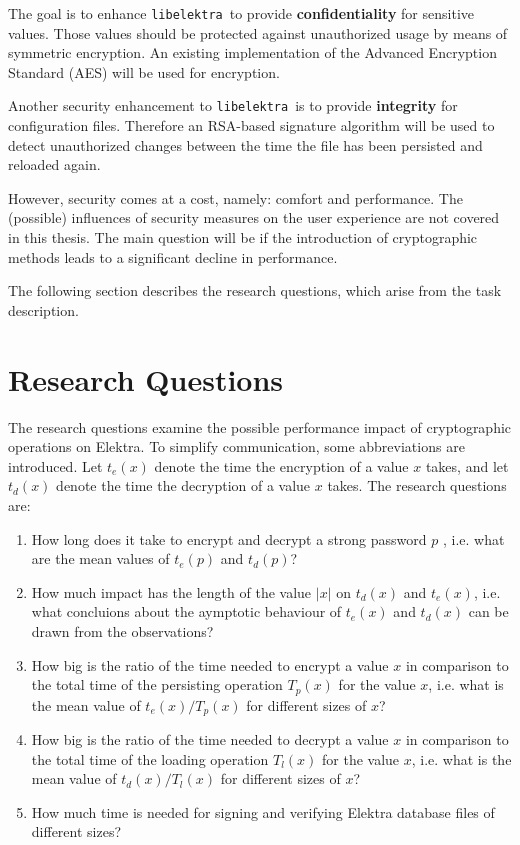 \documentclass[a4paper,12pt]{article}
\newcommand{\libelektra}{\texttt{libelektra}~}
\begin{document}
The goal is to enhance \libelektra to provide \textbf{confidentiality} for sensitive values.
Those values should be protected against unauthorized usage by means of symmetric encryption.
An existing implementation of the Advanced Encryption Standard (AES) will be used for encryption.

Another security enhancement to \libelektra is to provide \textbf{integrity} for configuration files.
Therefore an RSA-based signature algorithm will be used to detect unauthorized changes between the time the file has been persisted and reloaded again.

However, security comes at a cost, namely: comfort and performance. The (possible) influences of security measures on the user experience are not covered in this thesis. The main question will be if the introduction of cryptographic methods leads to a significant decline in performance.

The following section describes the research questions, which arise from the task description.


\section{Research Questions}

The research questions examine the possible performance impact of cryptographic operations on Elektra. 
To simplify communication, some abbreviations are introduced. 
Let $t_e(x)$ denote the time the encryption of a value $x$ takes, and let $t_d(x)$ denote the time the decryption of a value $x$ takes.
The research questions are:

\begin{enumerate}
\item How long does it take to encrypt and decrypt a strong password $p$ \cite{5461951,Holt:2011:IRS:2047456.2047461}, i.e. what are the mean values of $t_e(p)$ and $t_d(p)$?

\item How much impact has the length of the value $|x|$ on $t_d(x)$ and $t_e(x)$, i.e. what concluions about the aymptotic behaviour of $t_e(x)$ and $t_d(x)$ can be drawn from the observations?

\item How big is the ratio of the time needed to encrypt a value $x$ in comparison to the total time of the persisting operation $T_p(x)$ for the value $x$, i.e. what is the mean value of $t_e(x)/T_p(x)$ for different sizes of $x$?

\item How big is the ratio of the time needed to decrypt a value $x$ in comparison to the total time of the loading operation $T_l(x)$ for the value $x$, i.e. what is the mean value of $t_d(x)/T_l(x)$ for different sizes of $x$?

\item How much time is needed for signing and verifying Elektra database files of different sizes?

\end{enumerate}
\end{document}

